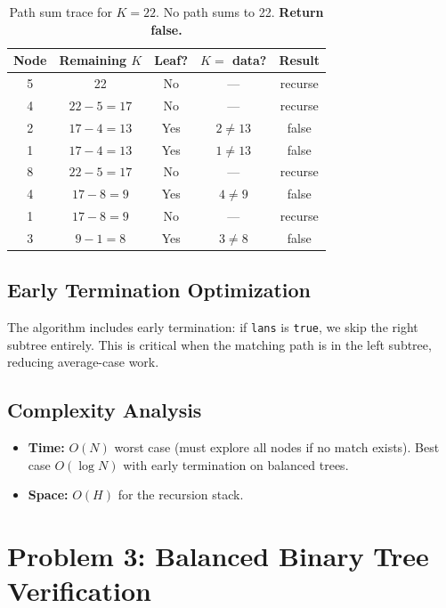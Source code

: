 \documentclass[10pt,journal,compsoc,onecolumn]{IEEEtran}
\begin{document}
\begin{table}[htbp]
\centering
\begin{tabular}{|c|c|c|c|c|}
\hline
\textbf{Node} & \textbf{Remaining $K$} & \textbf{Leaf?} & \textbf{$K = $ data?} & \textbf{Result} \\
\hline
5 & 22 & No & --- & recurse \\
4 & $22-5=17$ & No & --- & recurse \\
2 & $17-4=13$ & Yes & $2 \neq 13$ & false \\
1 & $17-4=13$ & Yes & $1 \neq 13$ & false \\
8 & $22-5=17$ & No & --- & recurse \\
4 & $17-8=9$ & Yes & $4 \neq 9$ & false \\
1 & $17-8=9$ & No & --- & recurse \\
3 & $9-1=8$ & Yes & $3 \neq 8$ & false \\
\hline
\end{tabular}
\caption{Path sum trace for $K=22$. No path sums to 22. \textbf{Return false.}}
\end{table}

\subsection{Early Termination Optimization}

The algorithm includes early termination: if \texttt{lans} is \texttt{true}, we skip the right subtree entirely. This is critical when the matching path is in the left subtree, reducing average-case work.

\subsection{Complexity Analysis}

\begin{itemize}
    \item \textbf{Time:} $O(N)$ worst case (must explore all nodes if no match exists). Best case $O(\log N)$ with early termination on balanced trees.
    \item \textbf{Space:} $O(H)$ for the recursion stack.
\end{itemize}

\section{Problem 3: Balanced Binary Tree Verification}
\label{sec:balanced}
\end{document}
